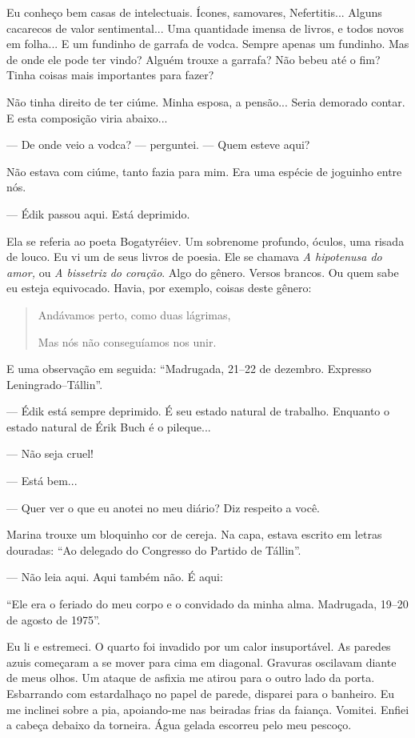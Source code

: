 Eu conheço bem casas de intelectuais. Ícones, samovares, Nefertitis...
Alguns cacarecos de valor sentimental... Uma quantidade imensa de
livros, e todos novos em folha... E um fundinho de garrafa de vodca.
Sempre apenas um fundinho. Mas de onde ele pode ter vindo? Alguém trouxe
a garrafa? Não bebeu até o fim? Tinha coisas mais importantes para
fazer?

Não tinha direito de ter ciúme. Minha esposa, a pensão... Seria demorado
contar. E esta composição viria abaixo...

--- De onde veio a vodca? --- perguntei. --- Quem esteve aqui?

Não estava com ciúme, tanto fazia para mim. Era uma espécie de joguinho
entre nós.

--- Édik passou aqui. Está deprimido.

Ela se referia ao poeta Bogatyréiev. Um sobrenome profundo, óculos, uma
risada de louco. Eu vi um de seus livros de poesia. Ele se chamava
\emph{A hipotenusa do amor,} ou \emph{A bissetriz do coração}. Algo do
gênero. Versos brancos. Ou quem sabe eu esteja equivocado. Havia, por
exemplo, coisas deste gênero:

\begin{quote}
Andávamos perto, como duas lágrimas,

Mas nós não conseguíamos nos unir.
\end{quote}

E uma observação em seguida: ``Madrugada, 21--22 de dezembro. Expresso
Leningrado--Tállin''.

--- Édik está sempre deprimido. É seu estado natural de trabalho.
Enquanto o estado natural de Érik Buch é o pileque...

--- Não seja cruel!

--- Está bem...

--- Quer ver o que eu anotei no meu diário? Diz respeito a você.

Marina trouxe um bloquinho cor de cereja. Na capa, estava escrito em
letras douradas: ``Ao delegado do Congresso do Partido de Tállin''.

--- Não leia aqui. Aqui também não. É aqui:

``Ele era o feriado do meu corpo e o convidado da minha alma. Madrugada,
19--20 de agosto de 1975''.

Eu li e estremeci. O quarto foi invadido por um calor insuportável. As
paredes azuis começaram a se mover para cima em diagonal. Gravuras
oscilavam diante de meus olhos. Um ataque de asfixia me atirou para o
outro lado da porta. Esbarrando com estardalhaço no papel de parede,
disparei para o banheiro. Eu me inclinei sobre a pia, apoiando-me nas
beiradas frias da faiança. Vomitei. Enfiei a cabeça debaixo da torneira.
Água gelada escorreu pelo meu pescoço.

